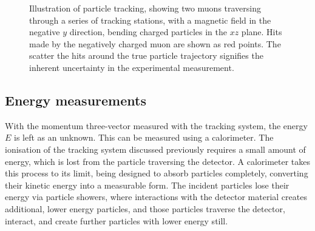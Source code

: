 \begin{figure}
  \centering
  
  \caption{%
    Illustration of particle tracking, showing two muons traversing through a 
    series of tracking stations, with a magnetic field in the negative $y$ 
    direction, bending charged particles in the $xz$ plane.
    Hits made by the negatively charged muon are shown as red points.
    The scatter the hits around the true particle trajectory signifies the 
    inherent uncertainty in the experimental measurement.
  }
  \label{fig:intro:lhcb:tracking}
\end{figure}

\subsection{Energy measurements}

With the momentum three-vector measured with the tracking system, the energy 
$E$ is left as an unknown.
This can be measured using a calorimeter.
The ionisation of the tracking system discussed previously requires a small 
amount of energy, which is lost from the particle traversing the detector.
A calorimeter takes this process to its limit, being designed to absorb 
particles completely, converting their kinetic energy into a measurable form.
The incident particles lose their energy via particle showers, where 
interactions with the detector material creates additional, lower energy 
particles, and those particles traverse the detector, interact, and create 
further particles with lower energy still.

